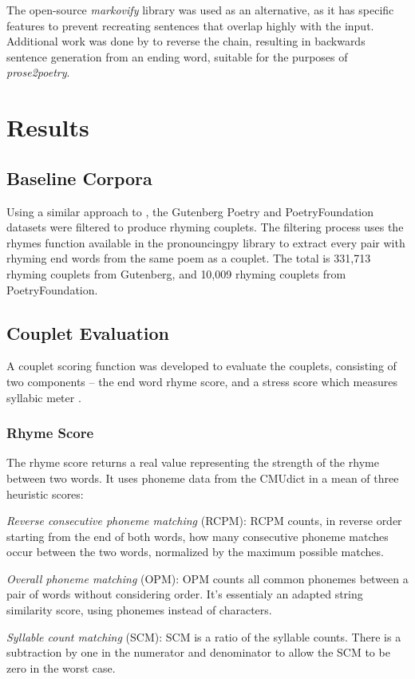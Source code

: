 \documentclass[11pt,a4paper]{article}
\newenvironment{tight_itemize}{
\begin{itemize}
\setlength{\itemsep}{0pt}
\setlength{\parskip}{0pt}
}{\end{itemize}}
\begin{document}
The open-source \textit{markovify} \cite{markovify} library was used as an alternative, as it has specific features to prevent recreating sentences that overlap highly with the input. Additional work was done by \citet{markovifyfork} to reverse the chain, resulting in backwards sentence generation from an ending word, suitable for the purposes of \textit{prose2poetry}.

\section{Results}
\label{sec:results}

\subsection{Baseline Corpora}
\label{sec:corpora}

Using a similar approach to \citet{cole}, the Gutenberg Poetry \cite{gutenbergpoetry} and PoetryFoundation \cite{poetryfoundationkaggle} datasets were filtered to produce rhyming couplets. The filtering process uses the rhymes function available in the pronouncingpy library to extract every pair with rhyming end words from the same poem as a couplet. The total is 331,713 rhyming couplets from Gutenberg, and 10,009 rhyming couplets from PoetryFoundation.

\subsection{Couplet Evaluation}
\label{sec:coupleteval}

A couplet scoring function was developed to evaluate the couplets, consisting of two components -- the end word rhyme score, and a stress score which measures syllabic meter \cite{meter_def}.

\subsubsection{Rhyme Score}
\label{sec:rhymescore}

The rhyme score returns a real value representing the strength of the rhyme between two words. It uses phoneme data from the CMUdict in a mean of three heuristic scores:
\begin{tight_itemize}
	\vspace{-0.5em}
	\item \textit{Reverse consecutive phoneme matching} (RCPM):
	RCPM counts, in reverse order starting from the end of both words, how many consecutive phoneme matches occur between the two words, normalized by the maximum possible matches.
	\item \textit{Overall phoneme matching} (OPM):
		OPM counts all common phonemes between a pair of words without considering order. It's essentialy an adapted \citet{ratcliff} string similarity score, using phonemes instead of characters.
	\item \textit{Syllable count matching} (SCM):
	SCM is a ratio of the syllable counts. There is a subtraction by one in the numerator and denominator to allow the SCM to be zero in the worst case.
\end{tight_itemize}
\end{document}
